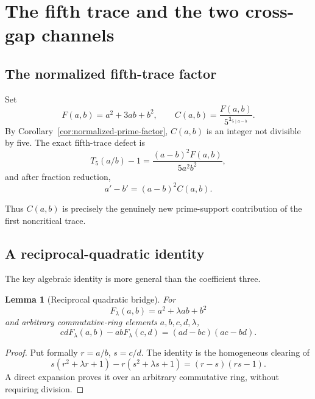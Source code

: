 \documentclass[11pt,oneside]{article}
\newtheorem{lemma}[theorem]{Lemma}
\theoremstyle{definition}
\theoremstyle{remark}
\begin{document}
\section{The fifth trace and the two cross-gap channels}
\label{sec:T5}

\subsection{The normalized fifth-trace factor}

Set
\begin{equation}
 F(a,b)=a^2+3ab+b^2,
 \qquad
 C(a,b)=\frac{F(a,b)}{5^{\mathbf1_{5\mid a-b}}}.
 \label{eq:F-C}
\end{equation}
By Corollary~\ref{cor:normalized-prime-factor}, \(C(a,b)\) is an integer not divisible by
five.  The exact fifth-trace defect is
\begin{equation}
 T_5(a/b)-1
 =\frac{(a-b)^2F(a,b)}{5a^2b^2},
 \label{eq:T5-defect-unreduced}
\end{equation}
and after fraction reduction,
\begin{equation}
 a'-b'=(a-b)^2C(a,b).
 \label{eq:T5-defect-reduced}
\end{equation}

Thus \(C(a,b)\) is precisely the genuinely new prime-support contribution of the first
noncritical trace.

\subsection{A reciprocal-quadratic identity}

The key algebraic identity is more general than the coefficient three.

\begin{lemma}[Reciprocal quadratic bridge]
\label{lem:quadratic-bridge}
For
\[
 F_\lambda(a,b)=a^2+\lambda ab+b^2
\]
and arbitrary commutative-ring elements \(a,b,c,d,\lambda\),
\begin{equation}
 \boxed{
 cdF_\lambda(a,b)-abF_\lambda(c,d)
 =(ad-bc)(ac-bd).}
 \label{eq:quadratic-bridge}
\end{equation}
\end{lemma}

\begin{proof}
Put formally \(r=a/b\), \(s=c/d\).  The identity is the homogeneous clearing of
\[
 s(r^2+\lambda r+1)-r(s^2+\lambda s+1)
 =(r-s)(rs-1).
\]
A direct expansion proves it over an arbitrary commutative ring, without requiring division.
\end{proof}
\end{document}
